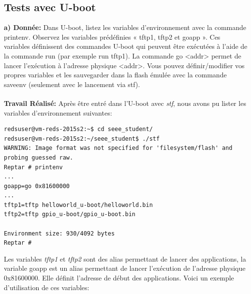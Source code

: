 \subsection{Tests avec U-boot}
\textbf{a) Donnée: }Dans U-boot, listez les variables d'environnement avec la commande printenv. Observez les
variables prédéfinies « tftp1, tftp2 et goapp ». Ces variables définissent des commandes U-boot qui
peuvent être exécutées à l'aide de la commande run (par exemple run tftp1).
La commande go <addr> permet de lancer l'exécution à l'adresse physique <addr>.
Vous pouvez définir/modifier vos propres variables et les sauvegarder dans la flash émulée avec la
commande saveenv (seulement avec le lancement via stf). \\\\
\textbf{Travail Réalisé: }Après être entré dans l'U-boot avec \textit{stf}, nous avons pu lister les variables d'environnement suivantes:
\begin{lstlisting}
redsuser@vm-reds-2015s2:~$ cd seee_student/
redsuser@vm-reds-2015s2:~/seee_student$ ./stf
WARNING: Image format was not specified for 'filesystem/flash' and probing guessed raw.
Reptar # printenv
...
goapp=go 0x81600000
...
tftp1=tftp helloworld_u-boot/helloworld.bin
tftp2=tftp gpio_u-boot/gpio_u-boot.bin

Environment size: 930/4092 bytes
Reptar # 
\end{lstlisting}
Les variables \textit{tftp1} et \textit{tftp2} sont des alias permettant de lancer des applications, la variable goapp est un alias permettant de lancer l'exécution de l'adresse physique 0x81600000. Elle définit l'adresse de début des applications. Voici un exemple d'utilisation de ces variables:
